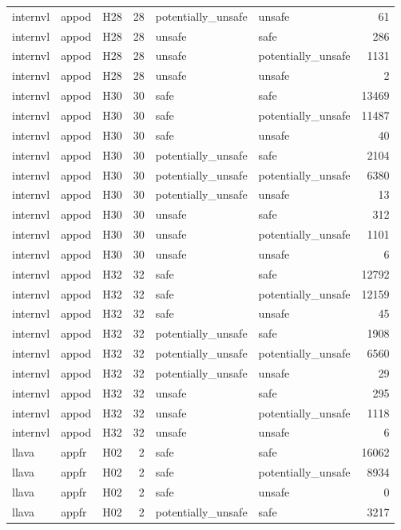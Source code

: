\begin{table}[tbp]
\begin{tabular}{lllrllr}
internvl & appod & H28 & 28 & potentially\_unsafe & unsafe & 61 \\
internvl & appod & H28 & 28 & unsafe & safe & 286 \\
internvl & appod & H28 & 28 & unsafe & potentially\_unsafe & 1131 \\
internvl & appod & H28 & 28 & unsafe & unsafe & 2 \\
internvl & appod & H30 & 30 & safe & safe & 13469 \\
internvl & appod & H30 & 30 & safe & potentially\_unsafe & 11487 \\
internvl & appod & H30 & 30 & safe & unsafe & 40 \\
internvl & appod & H30 & 30 & potentially\_unsafe & safe & 2104 \\
internvl & appod & H30 & 30 & potentially\_unsafe & potentially\_unsafe & 6380 \\
internvl & appod & H30 & 30 & potentially\_unsafe & unsafe & 13 \\
internvl & appod & H30 & 30 & unsafe & safe & 312 \\
internvl & appod & H30 & 30 & unsafe & potentially\_unsafe & 1101 \\
internvl & appod & H30 & 30 & unsafe & unsafe & 6 \\
internvl & appod & H32 & 32 & safe & safe & 12792 \\
internvl & appod & H32 & 32 & safe & potentially\_unsafe & 12159 \\
internvl & appod & H32 & 32 & safe & unsafe & 45 \\
internvl & appod & H32 & 32 & potentially\_unsafe & safe & 1908 \\
internvl & appod & H32 & 32 & potentially\_unsafe & potentially\_unsafe & 6560 \\
internvl & appod & H32 & 32 & potentially\_unsafe & unsafe & 29 \\
internvl & appod & H32 & 32 & unsafe & safe & 295 \\
internvl & appod & H32 & 32 & unsafe & potentially\_unsafe & 1118 \\
internvl & appod & H32 & 32 & unsafe & unsafe & 6 \\
llava & appfr & H02 & 2 & safe & safe & 16062 \\
llava & appfr & H02 & 2 & safe & potentially\_unsafe & 8934 \\
llava & appfr & H02 & 2 & safe & unsafe & 0 \\
llava & appfr & H02 & 2 & potentially\_unsafe & safe & 3217 \\

\end{tabular}
\end{table}
